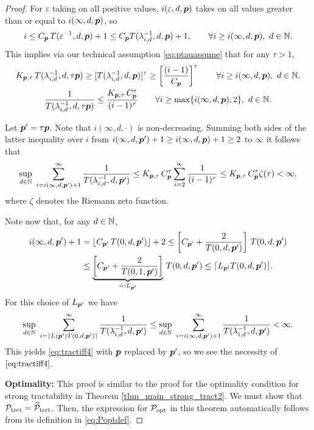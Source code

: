 \documentclass[11pt,a4paper]{article}
\begin{document}
\begin{proof}
For $\varepsilon$ taking on all positive values, $i(\varepsilon,d,\boldsymbol{p})$ takes on all values greater than or equal to $i(\infty,d,\boldsymbol{p})$, so
\[
i\le C_{\boldsymbol{p}}\, T(\varepsilon^{-1},d,\boldsymbol{p})+1 \le C_{\boldsymbol{p}} T(\lambda_{i,d}^{-1},d,\boldsymbol{p})+1, \qquad \forall i \ge i(\infty,d,\boldsymbol{p}),  \ d \in \mathbb{N}.
\]
This implies via our technical assumption \eqref{eq:ptauassume} that for any $\tau > 1$,
\begin{gather*}
	K_{\boldsymbol{p},\tau}\,T (\lambda_{i,d}^{-1},d,\tau \boldsymbol{p}) \ge
	[T(\lambda_{i,d}^{-1},d, \boldsymbol{p})]^\tau
	\ge
	\left[\frac{(i-1)}{C_{\boldsymbol{p}}}\right]^\tau \qquad \forall i \ge i(\infty,d,\boldsymbol{p}),  \ d \in \mathbb{N}, \\
	 \frac{1}{T (\lambda_{i,d}^{-1},d,\tau \boldsymbol{p})} \le
	\frac{K_{\boldsymbol{p},\tau}\, C_{\boldsymbol{p}}^\tau}{(i-1)^\tau}\qquad \forall i \ge \max\{i(\infty,d,\boldsymbol{p}),2\},  \ d \in \mathbb{N}.
\end{gather*}

Let $\boldsymbol{p}' = \tau \boldsymbol{p}$.  Note that $i(\infty,d,\cdot)$ is non-decreasing.  Summing both sides of the latter inequality over $i$ from $i(\infty,d,\boldsymbol{p}') + 1 \ge i(\infty,d, \boldsymbol{p}) + 1 \ge 2$ to $\infty$ it follows that
\begin{equation*}
	\sup_{d\in\mathbb{N}} \, \, \sum_{i=i (\infty,d,\boldsymbol{p}')+1}^\infty \frac{1}{T (\lambda_{i,d}^{-1},d,\boldsymbol{p}')}
	 \le  K_{\boldsymbol{p},\tau}\, C_{\boldsymbol{p}}^\tau
	\sum_{i=2}^\infty \frac{1}{(i-1)^\tau} \\
	 \le  K_{\boldsymbol{p},\tau}\, C_{\boldsymbol{p}}^\tau
	\zeta (\tau)  < \infty,
\end{equation*}
where $\zeta$ denotes the Riemann zeta function.


Note now that, for any $d\in\mathbb{N}$,
\begin{align*}
 i(\infty,d,\boldsymbol{p}') +1  & = \lfloor C_{\boldsymbol{p}'}\, T(0,d,\boldsymbol{p}')\rfloor +2 \le  \left[C_{\boldsymbol{p}'} + \frac{2}{T(0,d,\boldsymbol{p}')}   \right]\, T(0,d,\boldsymbol{p}')\\
 & \le  \underbrace{\left[C_{\boldsymbol{p}'} + \frac{2}{T(0,1,\boldsymbol{p}')}   \right]}_{=:L_{\boldsymbol{p}'}}\, T(0,d,\boldsymbol{p}')
 \le \lceil L_{\boldsymbol{p}'} T(0,d,\boldsymbol{p}')\rceil .
\end{align*}
For this choice of $L_{\boldsymbol{p}'}$ we have
\[
\sup_{d\in\mathbb{N}}\,\, \sum_{i=\lceil L(\boldsymbol{p}') T(0,d,\boldsymbol{p}')\rceil}^\infty \frac{1}{T(\lambda_{i,d}^{-1},d, \boldsymbol{p}')}
\le
\sup_{d\in\mathbb{N}} \, \, \sum_{i=i (\infty,d,\boldsymbol{p}')+1}^\infty \frac{1}{T (\lambda_{i,d}^{-1},d,\boldsymbol{p}')} <
\infty.
\]
This yields \eqref{eq:tractiff4} with $\boldsymbol{p}$ replaced by $\boldsymbol{p}'$, so we see the necessity of $\eqref{eq:tractiff4}$.

\bigskip

\noindent \textbf{Optimality:}
This proof is similar to the proof for the optimality condition for strong tractability in Theorem \ref{thm_main_strong_tract2}. We must show that $\mathcal{P}_{\textup{trct}} = \widetilde{\mathcal{P}}_{\textup{trct}}$.  Then, the expression for  $\mathcal{P}_{\textup{opt}}$ in this theorem automatically follows from its definition in \eqref{eq:Poptdef}.


\end{proof}
\end{document}
